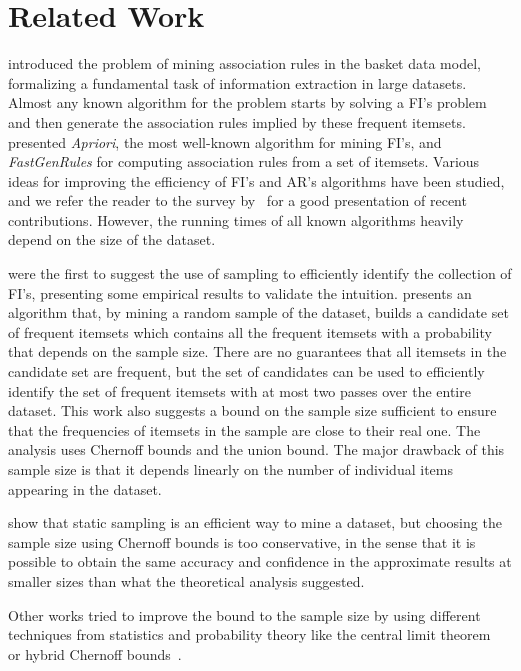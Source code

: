 \section{Related Work}\label{sec:prevwork}
\citet{AgrawalIS93} introduced the problem of mining association
rules in the basket data model, formalizing a fundamental task of information
extraction in large datasets. Almost any known algorithm for the problem starts
by solving a FI's problem and then generate the association rules implied by
these frequent itemsets. \citet{AgrawalS94} presented
\emph{Apriori}, the most well-known algorithm for mining FI's, and
\emph{FastGenRules} for computing association rules from a set of itemsets.
Various ideas for improving the efficiency of FI's and AR's algorithms have been
studied, and we refer the reader to the survey by~\citet{CeglarR06} for a good presentation of recent contributions.
However, the running times of all known algorithms heavily depend on the size of
the dataset.  

\citet{MannilaTV94} were the first to suggest the 
use of sampling to efficiently identify the collection of FI's, presenting some empirical
results to validate the intuition. \citet{Toivonen96} presents an
algorithm that, by mining a random sample of the dataset, builds a candidate set
of frequent itemsets which contains all the frequent itemsets with a probability
that depends on the sample size. There are no guarantees that all itemsets
in the candidate set are frequent, but the set of candidates can be used to
efficiently identify the set of frequent itemsets with at most two passes over
the entire dataset. This work also suggests a bound on the sample size sufficient
to ensure that the frequencies of itemsets in the sample are close to their real
one. The analysis uses Chernoff bounds and the union bound. The major drawback
of this sample size is that it depends linearly on the number of individual
items appearing in the dataset.

\citet{ZakiPLO97} show that static sampling is an efficient way to
mine a dataset, but choosing the sample size using Chernoff bounds is too
conservative, in the sense that it is possible to obtain the same accuracy and
confidence in the approximate results at smaller sizes than what the theoretical
analysis suggested. 

Other works tried to improve the bound to the sample size by using different
techniques from statistics and probability theory like the central limit
theorem~\citep{ZhangZW03,LiG04,JiaL05} or hybrid Chernoff
bounds~\citep{ZhaoZZ06}.

